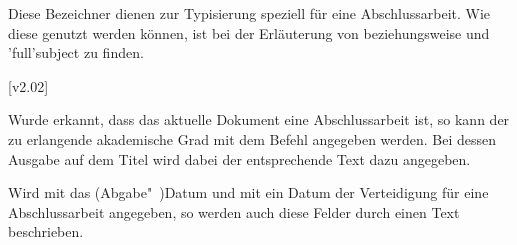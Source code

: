 \begin{DeclareEntity*}{}
\begin{DeclareEntity*}{}
\begin{DeclareEntity*}{}
\begin{Declaration}
\begin{Declaration}
\begin{Declaration}
\begin{Declaration}
\begin{Declaration}
\begin{Declaration}
\begin{Declaration}
\begin{Declaration}
\begin{Declaration}
\begin{Declaration}
\begin{Declaration}
\begin{Declaration}
\begin{Declaration}
Diese Bezeichner dienen zur Typisierung speziell für eine Abschlussarbeit. Wie 
diese genutzt werden können, ist bei der Erläuterung von 
beziehungsweise  und \Macro*'full'{subject} zu finden.
\end{Declaration}
\end{Declaration}
\end{Declaration}
\end{Declaration}
\end{Declaration}
\end{Declaration}
\end{Declaration}
\end{Declaration}
\end{Declaration}
\end{Declaration}
\end{Declaration}
\end{Declaration}
\end{Declaration}

\begin{Declaration}
  {}
  [v2.02]

Wurde erkannt, dass das aktuelle Dokument eine Abschlussarbeit ist, so kann der 
zu erlangende akademische Grad mit dem Befehl  angegeben 
werden. Bei dessen Ausgabe auf dem Titel wird dabei der entsprechende Text dazu 
angegeben.
\end{Declaration}

\begin{Declaration}
  {}
\begin{Declaration}
  {}

Wird mit  das (Abgabe"~)Datum und mit  ein Datum 
der Verteidigung für eine Abschlussarbeit angegeben, so werden auch diese 
Felder durch einen Text beschrieben.%
%
\end{Declaration}
\end{Declaration}
%


\end{DeclareEntity*}
\end{DeclareEntity*}
\end{DeclareEntity*}
